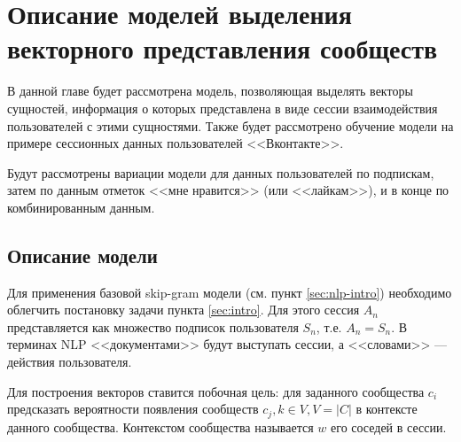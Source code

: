 \documentclass[times,specification,annotation]{itmo-student-thesis}
\begin{document}
\finishrelatedwork

\chapter{Описание моделей выделения векторного представления сообществ}

В данной главе будет рассмотрена модель, позволяющая выделять векторы
сущностей, информация о которых представлена в виде сессии взаимодействия
пользователей с этими сущностями.
Также будет рассмотрено обучение модели на примере сессионных данных пользователей <<Вконтакте>>. 

Будут рассмотрены вариации модели для данных пользователей по подпискам, затем по данным отметок <<мне нравится>> (или <<лайкам>>), и в конце по комбинированным данным.

\section{Описание модели}\label{sec:algo}

Для применения базовой skip-gram \cite{mikolov2013distributed} модели (см. пункт \ref{sec:nlp-intro}) необходимо облегчить постановку задачи пункта \ref{sec:intro}. Для этого сессия $A_n$ представляется как множество подписок пользователя $S_n$, т.е. $A_n = S_n$. В терминах NLP <<документами>> будут выступать сессии, а <<словами>> --- действия пользователя.

Для построения векторов ставится побочная цель: для заданного сообщества $c_i$ предсказать вероятности появления сообществ $c_j, k \in V, V = |C|$ в контексте данного сообщества. Контекстом сообщества называется $w$ его соседей в сессии. 
\end{document}
